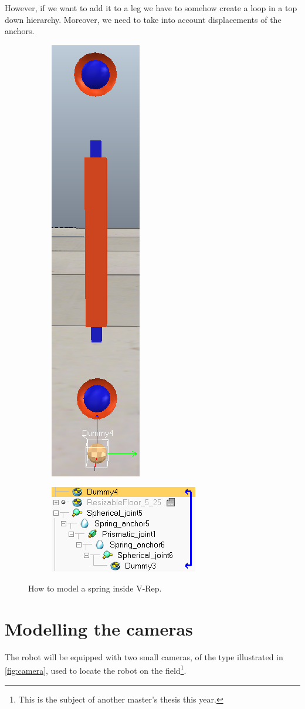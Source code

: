However, if we want to add it to a leg we have to somehow create a loop in a top down hierarchy. Moreover, we need to take into account displacements of the anchors. 
\begin{figure}[htp]
\center
    \begin{subfigure}[b]{0.45\textwidth}
    \center
    \includegraphics[height = 0.5\textwidth]{figures/springs}
    \end{subfigure}
    \hfill
    \begin{subfigure}[b]{0.45\textwidth}
    \center
    \includegraphics[height = 0.5\textwidth]{figures/springs_hierarchy}
    \end{subfigure}
\caption[Model of a spring inside V-Rep]{How to model a spring inside V-Rep. }
\label{fig:springs}
\end{figure}

\section{Modelling the cameras}
The robot will be equipped with two small cameras, of the type illustrated in \cref{fig:camera}, used to locate the robot on the field\footnote{This is the subject of another master's thesis this year.}. 

